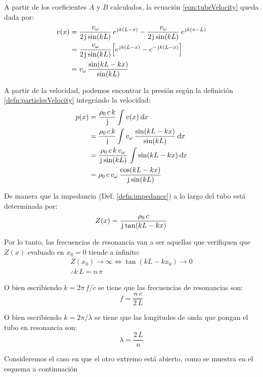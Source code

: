 \documentclass[a5paper,12pt,twoside]{book}
\begin{document}
A partir de los coeficientes $A$ y $B$ calculados, la ecuación \ref{eqn:tubeVelocity} queda dada por:
\begin{align*}
    v(x) &=
    \frac{v_\omega}{2\mkern2mu\mathrm{j}\mkern1mu \sin(kL)} \, e^{\mkern2mu\mathrm{j}\mkern1mu k(L-x)}
    - \frac{v_\omega}{2\mkern2mu\mathrm{j}\mkern1mu \sin(kL)} \, e^{\mkern2mu\mathrm{j}\mkern1mu k(x-L)}
    \\
    &= \frac{v_\omega}{2\mkern2mu\mathrm{j}\mkern1mu \sin(kL)} \Big[ e^{\mkern2mu\mathrm{j}\mkern1mu k(L-x)} - e^{-\mkern2mu\mathrm{j}\mkern1mu k(L-x)} \Big]
    \\
    &= v_\omega \, \frac{\sin(kL-kx)}{\sin(kL)}
\end{align*}

A partir de la velocidad, podemos encontrar la presión según la definición \ref{defn:particlesVelocity} integrándo la velocidad:
\begin{align*}
    p(x) &= \frac{\rho_0 \, c \, k}{\mkern2mu\mathrm{j}\mkern1mu} \int v(x) \, \textsl{d} x
    \\
    &= \frac{\rho_0 \, c \, k}{\mkern2mu\mathrm{j}\mkern1mu} \int v_\omega \, \frac{\sin(kL-kx)}{\sin(kL)} \, \textsl{d} x
    \\
    &= \frac{\rho_0 \, c \, k \, v_\omega}{\mkern2mu\mathrm{j}\mkern1mu \sin(kL)} \, \int \sin(kL-kx) \, \textsl{d} x
    \\
    &= \rho_0 \, c \, v_\omega \, \frac{\cos (kL-kx)}{\mkern2mu\mathrm{j}\mkern1mu \sin(kL)}
\end{align*}

De manera que la impedancia (Def. \ref{defn:impedance}) a lo largo del tubo está determinada por:
\begin{equation}
    Z(x) = \frac{\rho_0 \, c}{\mkern2mu\mathrm{j}\mkern1mu \tan(kL-kx)}
\end{equation}

Por lo tanto, las frecuencias de resonancia van a ser aquellas que verifiquen que $Z(x)$ evaluado en $x_0=0$ tiende a infinito:
\begin{gather*}
    Z(x_0) \to \infty
    \iff
    \tan(kL-kx_0) \to 0
    \\
    \therefore
    k\,L = n\,\pi
\end{gather*}

O bien escribiendo $k=2\pi\, f/c$ se tiene que las frecuencias de resonancias son:
\begin{equation}
    f = \frac{n \, c}{2 \, L}
\end{equation}

O bien escribiendo $k=2\pi/\lambda$ se tiene que las longitudes de onda que pongan el tubo en resonancia son:
\begin{equation}
    \lambda = \frac{2 \, L}{n}
\end{equation}

Consideremos el caso en que el otro extremo está abierto, como se muestra en el esquema a continuación
\end{document}
